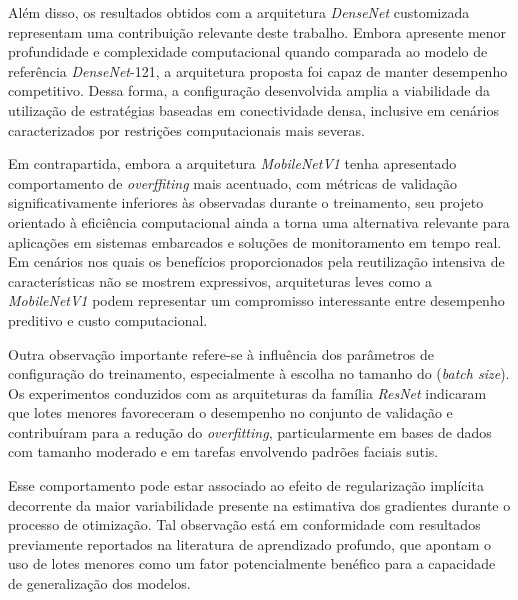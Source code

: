 Além disso, os resultados obtidos com a arquitetura \textit{DenseNet} customizada representam uma contribuição relevante deste trabalho. Embora apresente menor profundidade e complexidade computacional quando comparada ao modelo de referência \textit{DenseNet}-121, a arquitetura proposta foi capaz de manter desempenho competitivo. Dessa forma, a configuração desenvolvida amplia a viabilidade da utilização de estratégias baseadas em conectividade densa, inclusive em cenários caracterizados por restrições computacionais mais severas.

Em contrapartida, embora a arquitetura \textit{MobileNetV1} tenha apresentado comportamento de \textit{overffiting} mais acentuado, com métricas de validação significativamente inferiores às observadas durante o treinamento, seu projeto orientado à eficiência computacional ainda a torna uma alternativa relevante para aplicações em sistemas embarcados e soluções de monitoramento em tempo real. Em cenários nos quais os benefícios proporcionados pela reutilização intensiva de características não se mostrem expressivos, arquiteturas leves como a \textit{MobileNetV1} podem representar um compromisso interessante entre desempenho preditivo e custo computacional.

Outra observação importante refere-se à influência dos parâmetros de configuração do treinamento, especialmente à escolha no tamanho do (\textit{batch size}). Os experimentos conduzidos com as arquiteturas da família \textit{ResNet} indicaram que lotes menores favoreceram o desempenho no conjunto de validação e contribuíram para a redução do \textit{overfitting}, particularmente em bases de dados com tamanho moderado e em tarefas envolvendo padrões faciais sutis.

Esse comportamento pode estar associado ao efeito de regularização implícita decorrente da maior variabilidade presente na estimativa dos gradientes durante o processo de otimização. Tal observação está em conformidade com resultados previamente reportados na literatura de aprendizado profundo, que apontam o uso de lotes menores como um fator potencialmente benéfico para a capacidade de generalização dos modelos.

